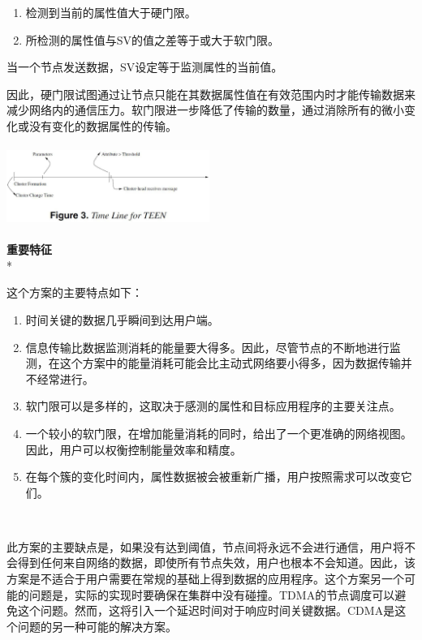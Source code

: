 \documentclass[journal]{IEEEtran}
\begin{document}
\begin{CJK}{UTF8}{gbsn}
\begin{enumerate}
 \setcounter{enumi}
 \item 检测到当前的属性值大于硬门限。
 \item 所检测的属性值与SV的值之差等于或大于软门限。
 
\end{enumerate}

\noindent
当一个节点发送数据，SV设定等于监测属性的当前值。

因此，硬门限试图通过让节点只能在其数据属性值在有效范围内时才能传输数据来减少网络内的通信压力。软门限进一步降低了传输的数量，通过消除所有的微小变化或没有变化的数据属性的传输。

\noindent
\includegraphics[height=100, width=250]{3.eps}

\textbf{重要特征}
\\*

这个方案的主要特点如下：
\\
\begin{enumerate}
 \setcounter{enumi}
 \item 时间关键的数据几乎瞬间到达用户端。
 \item 信息传输比数据监测消耗的能量要大得多。因此，尽管节点的不断地进行监测，在这个方案中的能量消耗可能会比主动式网络要小得多，因为数据传输并不经常进行。  \item 软门限可以是多样的，这取决于感测的属性和目标应用程序的主要关注点。
 \item 一个较小的软门限，在增加能量消耗的同时，给出了一个更准确的网络视图。因此，用户可以权衡控制能量效率和精度。
 \item 在每个簇的变化时间内，属性数据被会被重新广播，用户按照需求可以改变它们。
 \end{enumerate}

\

此方案的主要缺点是，如果没有达到阈值，节点间将永远不会进行通信，用户将不会得到任何来自网络的数据，即使所有节点失效，用户也根本不会知道。因此，该方案是不适合于用户需要在常规的基础上得到数据的应用程序。这个方案另一个可能的问题是，实际的实现时要确保在集群中没有碰撞。TDMA的节点调度可以避免这个问题。然而，这将引入一个延迟时间对于响应时间关键数据。CDMA是这个问题的另一种可能的解决方案。


\end{CJK}
\end{document}
